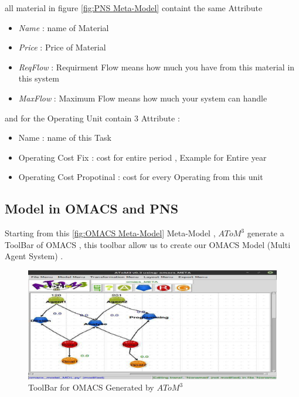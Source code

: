 all material in figure \ref{fig:PNS Meta-Model} containt the same Attribute
\begin{itemize}


\item \textit{Name} : name of Material 
\item \textit{Price} : Price of Material
\item \textit{ReqFlow} : Requirment Flow means how much you have from this material in this system
\item \textit{MaxFlow} : Maximum Flow means how much your system can handle

\end{itemize}



and for the Operating Unit contain 3 Attribute : 
\begin{itemize}

\item Name : name of this Task 
\item Operating Cost Fix  : cost for entire period ,  Example for Entire year
\item Operating Cost Propotinal  :  cost for every Operating from this unit

\end{itemize}
 


\subsection{ Model in OMACS and PNS }

Starting from this  \ref{fig:OMACS Meta-Model} Meta-Model , $AToM^3$ generate a ToolBar of OMACS  , this toolbar allow us to create our OMACS Model (Multi Agent System) .
\vspace{0.1cm}
\begin{figure}[th]
	\centering
 	\includegraphics{Chapiter3/img/omacsMDL}
	\caption{\label{fig:OMACS Model}ToolBar for OMACS Generated by $AToM^3$ }
\end{figure} 


